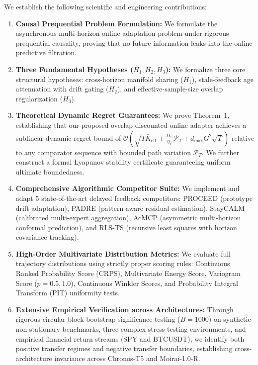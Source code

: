 \documentclass[10pt,journal,compsoc]{IEEEtran}
\begin{document}
We establish the following scientific and engineering contributions:
\begin{enumerate}
    \item \textbf{Causal Prequential Problem Formulation:} We formulate the asynchronous multi-horizon online adaptation problem under rigorous prequential causality, proving that no future information leaks into the online predictive filtration.
    \item \textbf{Three Fundamental Hypotheses ($H_1, H_2, H_3$):} We formalize three core structural hypotheses: cross-horizon manifold sharing ($H_1$), stale-feedback age attenuation with drift gating ($H_2$), and effective-sample-size overlap regularization ($H_3$).
    \item \textbf{Theoretical Dynamic Regret Guarantees:} We prove Theorem~1, establishing that our proposed overlap-discounted online adapter achieves a sublinear dynamic regret bound of $\mathcal{O}\left(\sqrt{T \bar{K}_{\text{eff}}} + \frac{D_{\mathcal{Z}}}{\eta_T}\mathcal{P}_T + d_{\max} G^2 \sqrt{T}\right)$ relative to any comparator sequence with bounded path variation $\mathcal{P}_T$. We further construct a formal Lyapunov stability certificate guaranteeing uniform ultimate boundedness.
    \item \textbf{Comprehensive Algorithmic Competitor Suite:} We implement and adapt 5 state-of-the-art delayed feedback competitors: PROCEED (prototype drift adaptation), PADRE (pattern-aware residual estimation), StayCALM (calibrated multi-expert aggregation), AcMCP (asymmetric multi-horizon conformal prediction), and RLS-TS (recursive least squares with horizon covariance tracking).
    \item \textbf{High-Order Multivariate Distribution Metrics:} We evaluate full trajectory distributions using strictly proper scoring rules: Continuous Ranked Probability Score (CRPS), Multivariate Energy Score, Variogram Score ($p=0.5, 1.0$), Continuous Winkler Scores, and Probability Integral Transform (PIT) uniformity tests.
    \item \textbf{Extensive Empirical Verification across Architectures:} Through rigorous circular block bootstrap significance testing ($B=1000$) on synthetic non-stationary benchmarks, three complex stress-testing environments, and empirical financial return streams (SPY and BTCUSDT), we identify both positive transfer regimes and negative transfer boundaries, establishing cross-architecture invariance across Chronos-T5 and Moirai-1.0-R.
\end{enumerate}
\end{document}
